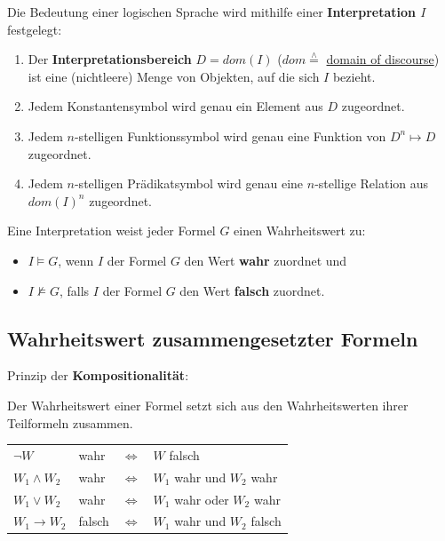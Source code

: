 \documentclass[runningheads,deutsch]{llncs}
\newcommand{\estimates}{\overset{\scriptscriptstyle\wedge}{=}}
\begin{document}
Die Bedeutung einer logischen Sprache wird mithilfe einer \textbf{Interpretation $I$} festgelegt:

\begin{enumerate}
    \item Der \textbf{Interpretationsbereich} $D = dom(I)$ ($dom \estimates$ \href{https://en.wikipedia.org/wiki/Domain_of_discourse}{domain of discourse}) ist eine (nichtleere) Menge von Objekten, auf die sich $I$ bezieht.
    \item Jedem Konstantensymbol wird genau ein Element aus $D$ zugeordnet.
    \item Jedem $n$-stelligen Funktionssymbol wird genau eine Funktion von $D^n \mapsto D$ zugeordnet.
    \item Jedem $n$-stelligen Prädikatsymbol wird genau eine $n$-stellige Relation aus $dom(I)^n$ zugeordnet.
\end{enumerate}
Eine Interpretation weist jeder Formel $G$ einen Wahrheitswert zu:

\begin{itemize}
    \item $I \vDash G$, wenn $I$ der Formel $G$ den Wert \textbf{wahr} zuordnet und
    \item $I \nvDash G$, falls $I$ der Formel $G$ den Wert \textbf{falsch} zuordnet.
\end{itemize}

\subsection{Wahrheitswert zusammengesetzter Formeln}

Prinzip der \textbf{Kompositionalität}:

Der Wahrheitswert einer Formel setzt sich aus den Wahrheitswerten ihrer Teilformeln zusammen.

\begin{center}
    \begin{tabular}{l l l l}
        $\lnot W$ & wahr & $\Leftrightarrow$ & $W$ falsch \\
        $W_1 \land W_2$ & wahr & $\Leftrightarrow$ & $W_1$ wahr und $W_2$ wahr \\
        $W_1 \lor W_2$ & wahr & $\Leftrightarrow$ & $W_1$ wahr oder $W_2$ wahr \\
        $W_1 \rightarrow W_2$ & falsch & $\Leftrightarrow$ & $W_1$ wahr und $W_2$ falsch
    \end{tabular}
\end{center}
\end{document}
